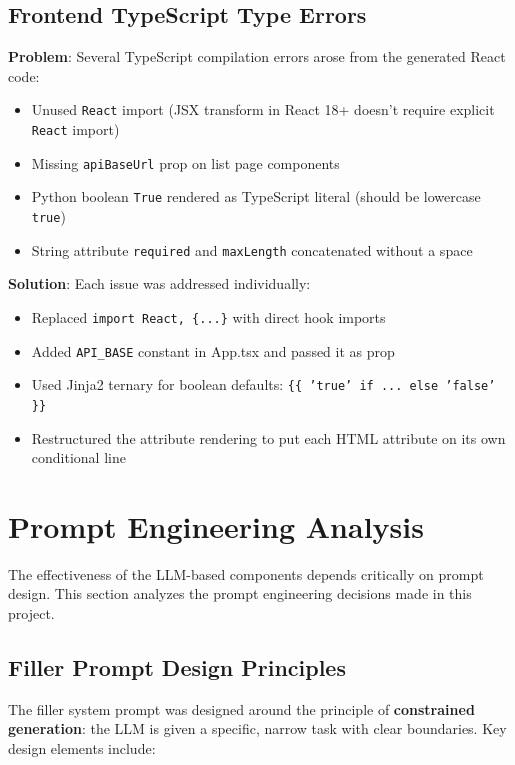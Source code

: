 \documentclass[11pt,a4paper]{article}
\begin{document}
{\subsection{Frontend TypeScript Type Errors}

\textbf{Problem}: Several TypeScript compilation errors arose from the generated React code:
\begin{itemize}
    \item Unused \texttt{React} import (JSX transform in React 18+ doesn't require explicit \texttt{React} import)
    \item Missing \texttt{apiBaseUrl} prop on list page components
    \item Python boolean \texttt{True} rendered as TypeScript literal (should be lowercase \texttt{true})
    \item String attribute \texttt{required} and \texttt{maxLength} concatenated without a space
\end{itemize}

\textbf{Solution}: Each issue was addressed individually:
\begin{itemize}
    \item Replaced \texttt{import React, \{...\}} with direct hook imports
    \item Added \texttt{API\_BASE} constant in App.tsx and passed it as prop
    \item Used Jinja2 ternary for boolean defaults: \texttt{\{\{ 'true' if ... else 'false' \}\}}
    \item Restructured the attribute rendering to put each HTML attribute on its own conditional line
\end{itemize}

\newpage
\section{Prompt Engineering Analysis}
\label{sec:prompts}

The effectiveness of the LLM-based components depends critically on prompt design. This section analyzes the prompt engineering decisions made in this project.

\subsection{Filler Prompt Design Principles}

The filler system prompt was designed around the principle of \textbf{constrained generation}: the LLM is given a specific, narrow task with clear boundaries. Key design elements include:

}
\end{document}
